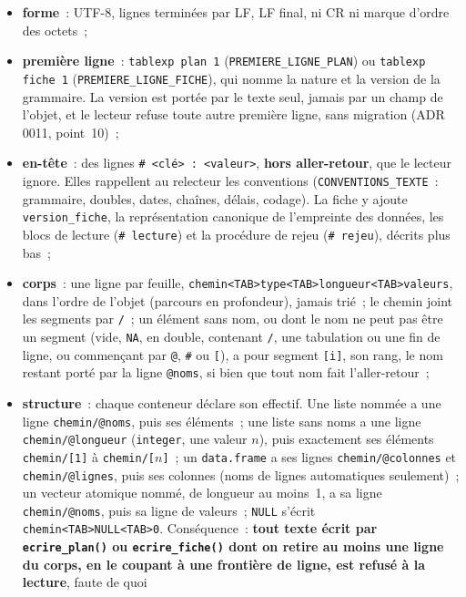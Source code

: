 \documentclass[a4paper,11pt]{article}
\newcommand{\code}[1]{\texttt{\small #1}}
\begin{document}
\begin{itemize}[leftmargin=*, itemsep=2pt]
  \item \textbf{forme}~: UTF-8, lignes terminées par LF, LF final, ni CR ni
    marque d'ordre des octets~;
  \item \sloppy \textbf{première ligne}~: \code{tablexp plan 1}
    (\code{PREMIERE\_LIGNE\_PLAN}) ou \code{tablexp fiche 1}
    (\code{PREMIERE\_LIGNE\_FICHE}), qui nomme la nature et la version de la
    grammaire. La version est portée par le texte seul, jamais par un champ de
    l'objet, et le lecteur refuse toute autre première ligne, sans migration
    (ADR 0011, point~10)~;
  \item \textbf{en-tête}~: des lignes \code{\# <clé> : <valeur>},
    \textbf{hors aller-retour}, que le lecteur ignore. Elles rappellent au
    relecteur les conventions (\code{CONVENTIONS\_TEXTE}~: grammaire,
    doubles, dates, chaînes, délais, codage). La fiche y ajoute
    \code{version\_fiche}, la représentation canonique de l'empreinte des
    données, les blocs de lecture (\code{\# lecture}) et la procédure de rejeu
    (\code{\# rejeu}), décrits plus bas~;
  \item \textbf{corps}~: une ligne par feuille,
    \code{chemin<TAB>type<TAB>longueur<TAB>valeurs}, dans l'ordre de l'objet
    (parcours en profondeur), jamais trié~; le chemin joint les segments par
    \code{/}~; un élément sans nom, ou dont le nom ne peut pas être un segment
    (vide, \code{NA}, en double, contenant \code{/}, une tabulation ou une fin
    de ligne, ou commençant par \code{@}, \code{\#} ou \code{[}), a pour
    segment \code{[i]}, son rang, le nom restant porté par la ligne
    \code{@noms}, si bien que tout nom fait l'aller-retour~;
  \item \textbf{structure}~: chaque conteneur déclare son effectif. Une liste
    nommée a une ligne \code{chemin/@noms}, puis ses éléments~; une liste sans
    noms a une ligne \code{chemin/@longueur} (\code{integer}, une valeur
    $n$), puis exactement ses éléments \code{chemin/[1]} à
    \code{chemin/[$n$]}~; un \code{data.frame} a ses lignes
    \code{chemin/@colonnes} et \code{chemin/@lignes}, puis ses colonnes
    (noms de lignes automatiques seulement)~; un vecteur atomique nommé, de
    longueur au moins~1, a sa ligne \code{chemin/@noms}, puis sa ligne de
    valeurs~; \code{NULL} s'écrit \code{chemin<TAB>NULL<TAB>0}.
    Conséquence~: \textbf{tout texte écrit par \code{ecrire\_plan()} ou
    \code{ecrire\_fiche()} dont on retire au moins une ligne du corps, en le
    coupant à une frontière de ligne, est refusé à la lecture}, faute de quoi

\end{itemize}
\end{document}
